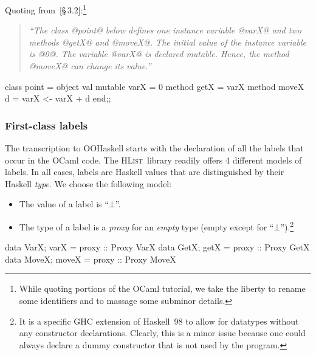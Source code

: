 \documentclass{jfp}
\newcommand{\HList}{\textsc{HList}}
\newcommand{\undefined}{\ensuremath{\bot}}
\begin{document}
Quoting from~\cite{OCaml}[\S\,3.2]:\footnote{While quoting portions of
the OCaml tutorial, we take the liberty to rename some identifiers and
to massage some subminor details.}

\begin{quote}\itshape\small
``The class @point@ below defines one instance variable @varX@ and two
methods @getX@ and @moveX@. The initial value of the instance variable
is @0@. The variable @varX@ is declared mutable. Hence, the method
@moveX@ can change its value.''
\end{quote}

\begin{code}
 class point =
   object
     val mutable varX = 0
     method getX      = varX
     method moveX d   = varX <- varX + d
   end;;
\end{code}






\subsubsection{First-class labels}

The transcription to OOHaskell starts with the declaration of all the
labels that occur in the OCaml code. The \HList\ library readily
offers 4 different models of labels. In all cases, labels are Haskell
values that are distinguished by their Haskell \emph{type}. We choose
the following model:
%
\begin{itemize}
\item
The value of a label is ``\undefined''.
\item
The type of a label is a \emph{proxy} for an \emph{empty} type (empty
except for ``\undefined'').\footnote{It is a specific GHC extension of
Haskell~98 to allow for datatypes without any constructor
declarations. Clearly, this is a minor issue because one could always
declare a dummy constructor that is not used by the program.}
\end{itemize}

\begin{code}
 data VarX;  varX  = proxy :: Proxy VarX 
 data GetX;  getX  = proxy :: Proxy GetX
 data MoveX; moveX = proxy :: Proxy MoveX
\end{code}
\end{document}
